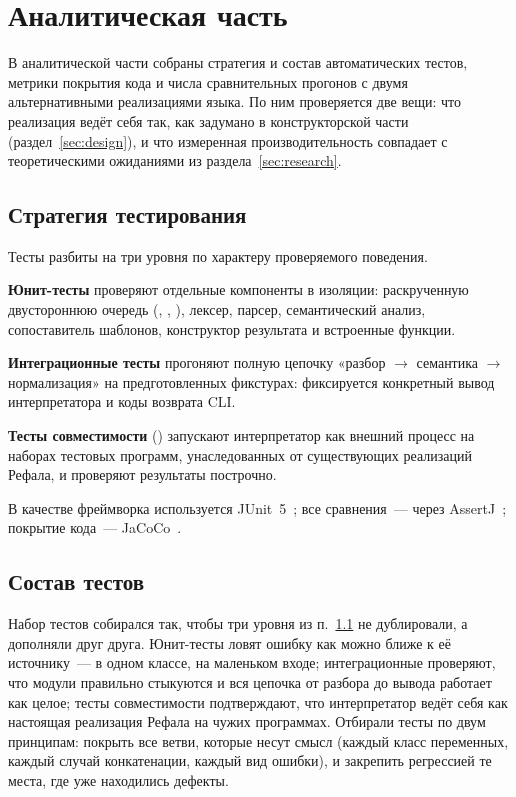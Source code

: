 \section{Аналитическая часть}
\label{sec:anal}

В аналитической части собраны стратегия и состав автоматических тестов, метрики
покрытия кода и числа сравнительных прогонов с двумя альтернативными реализациями языка.
По ним проверяется две вещи: что реализация ведёт себя так, как задумано в конструкторской
части (раздел~\ref{sec:design}), и что измеренная производительность совпадает с
теоретическими ожиданиями из раздела~\ref{sec:research}.

\subsection{Стратегия тестирования}
\label{subsec:test-strategy}

Тесты разбиты на три уровня по характеру проверяемого поведения.

\textbf{Юнит-тесты} проверяют отдельные компоненты в изоляции: раскрученную
двустороннюю очередь (, , ),
лексер, парсер, семантический анализ, сопоставитель шаблонов,
конструктор результата и встроенные функции.

\textbf{Интеграционные тесты} прогоняют полную цепочку «разбор
$\to$ семантика $\to$ нормализация» на предготовленных фикстурах:
фиксируется конкретный вывод интерпретатора и коды возврата CLI.

\textbf{Тесты совместимости} () запускают
интерпретатор как внешний процесс на наборах тестовых программ, унаследованных
от существующих реализаций Рефала, и проверяют результаты построчно.

В качестве фреймворка используется JUnit~5~\cite{junit5_guide};
все сравнения~--- через AssertJ~\cite{assertj_docs};
покрытие кода~--- JaCoCo~\cite{jacoco_docs}.

\subsection{Состав тестов}
\label{subsec:test-counts}

Набор тестов собирался так, чтобы три уровня из п.~\ref{subsec:test-strategy} не
дублировали, а дополняли друг друга. Юнит-тесты ловят ошибку как можно ближе к её
источнику~--- в одном классе, на маленьком входе; интеграционные проверяют, что модули
правильно стыкуются и вся цепочка от разбора до вывода работает как целое;
тесты совместимости подтверждают, что интерпретатор ведёт себя как настоящая реализация
Рефала на чужих программах. Отбирали тесты по двум принципам: покрыть все ветви, которые
несут смысл (каждый класс переменных, каждый случай конкатенации, каждый вид ошибки), и
закрепить регрессией те места, где уже находились дефекты.

